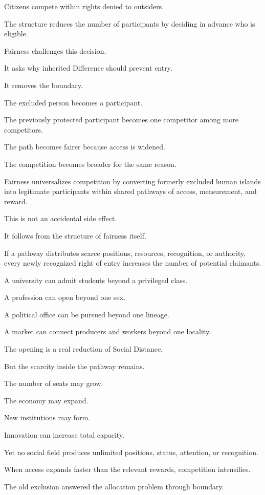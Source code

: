 Citizens compete within rights denied to outsiders.

The structure reduces the number of participants by deciding in advance who is eligible.

Fairness challenges this decision.

It asks why inherited Difference should prevent entry.

It removes the boundary.

The excluded person becomes a participant.

The previously protected participant becomes one competitor among more competitors.

The path becomes fairer because access is widened.

The competition becomes broader for the same reason.

Fairness universalizes competition by converting formerly excluded human islands into legitimate participants within shared pathways of access, measurement, and reward.

This is not an accidental side effect.

It follows from the structure of fairness itself.

If a pathway distributes scarce positions, resources, recognition, or authority, every newly recognized right of entry increases the number of potential claimants.

A university can admit students beyond a privileged class.

A profession can open beyond one sex.

A political office can be pursued beyond one lineage.

A market can connect producers and workers beyond one locality.

The opening is a real reduction of Social Distance.

But the scarcity inside the pathway remains.

The number of seats may grow.

The economy may expand.

New institutions may form.

Innovation can increase total capacity.

Yet no social field produces unlimited positions, status, attention, or recognition.

When access expands faster than the relevant rewards, competition intensifies.

The old exclusion answered the allocation problem through boundary.

